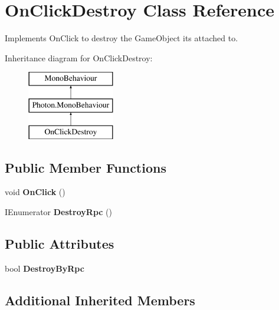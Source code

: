 \hypertarget{class_on_click_destroy}{}\section{On\+Click\+Destroy Class Reference}
\label{class_on_click_destroy}


Implements On\+Click to destroy the Game\+Object it\textquotesingle{}s attached to.  


Inheritance diagram for On\+Click\+Destroy\+:\begin{figure}[H]
\begin{center}
\leavevmode
\includegraphics[height=3.000000cm]{class_on_click_destroy}
\end{center}
\end{figure}
\subsection*{Public Member Functions}
\begin{DoxyCompactItemize}
\item 
void {\bfseries On\+Click} ()\hypertarget{class_on_click_destroy_ad6050d0a7dac6afab6063ca7b94c317c}{}\label{class_on_click_destroy_ad6050d0a7dac6afab6063ca7b94c317c}

\item 
I\+Enumerator {\bfseries Destroy\+Rpc} ()\hypertarget{class_on_click_destroy_aa4c9d02e0298626789a0c58640ecb827}{}\label{class_on_click_destroy_aa4c9d02e0298626789a0c58640ecb827}

\end{DoxyCompactItemize}
\subsection*{Public Attributes}
\begin{DoxyCompactItemize}
\item 
bool {\bfseries Destroy\+By\+Rpc}\hypertarget{class_on_click_destroy_ac2047f6e4afd9f42f366c09b7ffd7570}{}\label{class_on_click_destroy_ac2047f6e4afd9f42f366c09b7ffd7570}

\end{DoxyCompactItemize}
\subsection*{Additional Inherited Members}


